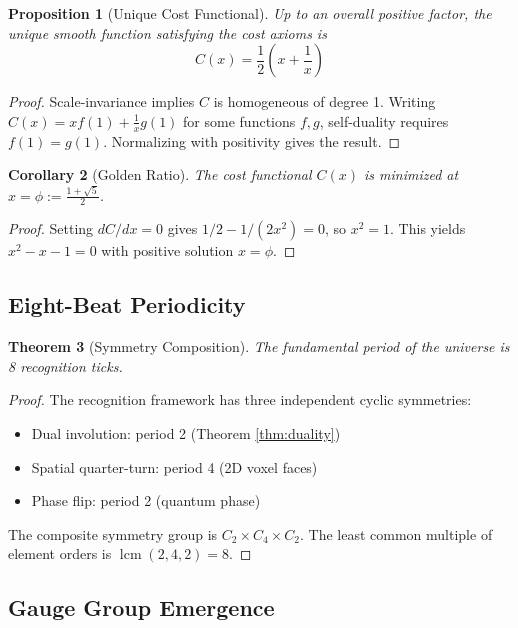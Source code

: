 \documentclass[12pt,a4paper]{article}
\newtheorem{theorem}{Theorem}
\newtheorem{proposition}[theorem]{Proposition}
\newtheorem{corollary}[theorem]{Corollary}
\DeclareMathOperator{\lcm}{lcm}
\begin{document}
\begin{proposition}[Unique Cost Functional]\label{prop:cost}
Up to an overall positive factor, the unique smooth function satisfying the cost axioms is
\[
C(x) = \frac{1}{2}\left(x + \frac{1}{x}\right)
\]
\end{proposition}

\begin{proof}
Scale-invariance implies $C$ is homogeneous of degree 1. Writing $C(x) = xf(1) + \frac{1}{x}g(1)$ for some functions $f, g$, self-duality requires $f(1) = g(1)$. Normalizing with positivity gives the result.
\end{proof}

\begin{corollary}[Golden Ratio]\label{cor:golden}
The cost functional $C(x)$ is minimized at $x = \phi := \frac{1+\sqrt{5}}{2}$.
\end{corollary}

\begin{proof}
Setting $dC/dx = 0$ gives $1/2 - 1/(2x^2) = 0$, so $x^2 = 1$. This yields $x^2 - x - 1 = 0$ with positive solution $x = \phi$.
\end{proof}

\subsection{Eight-Beat Periodicity}

\begin{theorem}[Symmetry Composition]\label{thm:eightbeat}
The fundamental period of the universe is 8 recognition ticks.
\end{theorem}

\begin{proof}
The recognition framework has three independent cyclic symmetries:
\begin{itemize}
\item Dual involution: period 2 (Theorem \ref{thm:duality})
\item Spatial quarter-turn: period 4 (2D voxel faces)
\item Phase flip: period 2 (quantum phase)
\end{itemize}
The composite symmetry group is $C_2 \times C_4 \times C_2$. The least common multiple of element orders is $\lcm(2, 4, 2) = 8$.
\end{proof}

\subsection{Gauge Group Emergence}
\end{document}
